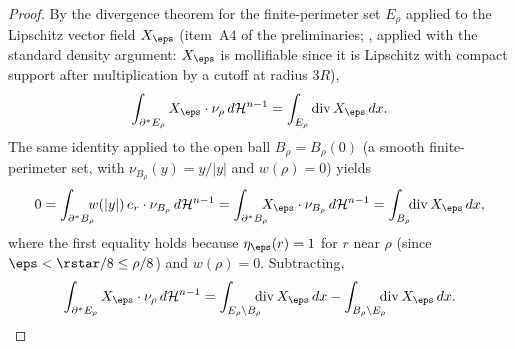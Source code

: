 \begin{proof}
By the divergence theorem for the finite-perimeter set $E_\rho$ applied to
the Lipschitz vector field $X_\eps$ (item~A4 of the preliminaries;
\cite[Thm.\ 16.3]{Maggi2012}, applied with the standard density argument:
$X_\eps$ is mollifiable since it is Lipschitz with compact support after
multiplication by a cutoff at radius $3R$),
\begin{equation}\label{eq:div-eps}
   \int_{\partial^*E_\rho}X_\eps\cdot\nu_\rho\,d\mathcal H^{n-1}
   =\int_{E_\rho}\mathrm{div}\,X_\eps\,dx.
\end{equation}
The same identity applied to the open ball $B_\rho=B_\rho(0)$ (a smooth
finite-perimeter set, with $\nu_{B_\rho}(y)=y/|y|$ and $w(\rho)=0$) yields
\begin{equation}\label{eq:div-eps-ball}
   0
   =\int_{\partial^*B_\rho}\!\!\!\!w(|y|)\,e_r\cdot\nu_{B_\rho}\,d\mathcal H^{n-1}
   =\int_{\partial^*B_\rho}\!\!\!\!X_\eps\cdot\nu_{B_\rho}\,d\mathcal H^{n-1}
   =\int_{B_\rho}\!\!\mathrm{div}\,X_\eps\,dx,
\end{equation}
where the first equality holds because $\eta_\eps(r)=1$ for $r$ near $\rho$
(since $\eps<\rstar/8\le\rho/8$) and $w(\rho)=0$. Subtracting,
\begin{equation}\label{eq:div-eps-diff}
   \int_{\partial^*E_\rho}X_\eps\cdot\nu_\rho\,d\mathcal H^{n-1}
   =\int_{E_\rho\setminus B_\rho}\!\!\!\!\mathrm{div}\,X_\eps\,dx
    -\int_{B_\rho\setminus E_\rho}\!\!\!\!\mathrm{div}\,X_\eps\,dx.
\end{equation}


\end{proof}
